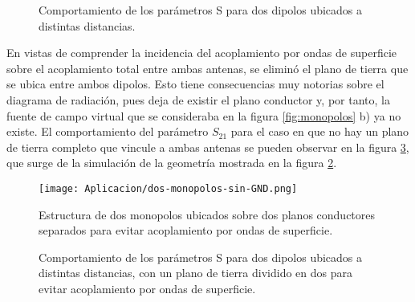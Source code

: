 \begin{figure}[H]
	\centering 
	\hspace{0pt}
	\caption{Comportamiento de los parámetros S para dos dipolos ubicados a distintas distancias.}
	\label{fig:dipolos-distancia-resultados}	
\end{figure}  

En vistas de comprender la incidencia del acoplamiento por ondas de superficie sobre el acoplamiento total entre ambas antenas, se eliminó el plano de tierra que se ubica entre ambos dipolos. Esto tiene consecuencias muy notorias sobre el diagrama de radiación, pues deja de existir el plano conductor y, por tanto, la fuente de campo virtual que se consideraba en la figura \ref{fig:monopolos} b) ya no existe. El comportamiento del parámetro $S_{21}$ para el caso en que no hay un plano de tierra completo que vincule a ambas antenas se pueden observar en la figura \ref{fig:monopolos-sin-plano-de-tierra-resultados}, que surge de la simulación de la geometría mostrada en la figura \ref{fig:monopolos-sin-plano-de-tierra-geometria}. 


\begin{figure}[H]
	\centering
	\texttt{[image: Aplicacion/dos-monopolos-sin-GND.png]}
	\caption{Estructura de dos monopolos ubicados sobre dos planos conductores separados para evitar acoplamiento por ondas de superficie.}
	\label{fig:monopolos-sin-plano-de-tierra-geometria}
\end{figure}

\begin{figure}[H]
	\centering 
	\hspace{0pt}
	\caption{Comportamiento de los parámetros S para dos dipolos ubicados a distintas distancias, con un plano de tierra dividido en dos para evitar acoplamiento por ondas de superficie.}
	\label{fig:monopolos-sin-plano-de-tierra-resultados}	
\end{figure}  

